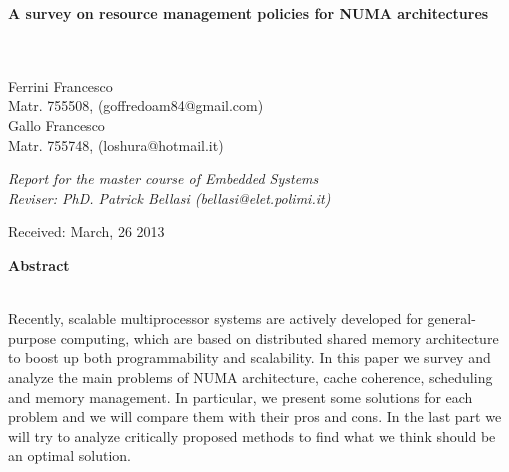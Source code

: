 \documentclass[a4paper,10pt]{article}
\newenvironment*{mytitle}{\begin{LARGE}\bf}{\end{LARGE}\\}%
\newenvironment*{myabstract}{\begin{Large}\bf}{\end{Large}\\[2.5ex]}%
\begin{document}
\begin{mytitle}A survey on resource management policies for NUMA architectures\end{mytitle}
%
%
\\
Ferrini Francesco\\
Matr. 755508, (goffredoam84@gmail.com)\\
\hspace{10ex}
Gallo Francesco\\
Matr. 755748, (loshura@hotmail.it)\\
\begin{flushright}
\emph{Report for the master course of Embedded Systems}\\
\emph{Reviser: PhD. Patrick Bellasi (bellasi@elet.polimi.it)}
\end{flushright}

Received: March, 26 2013\\
\hspace{10ex}

\begin{myabstract} Abstract \end{myabstract}
Recently, scalable multiprocessor systems are actively developed for general-purpose computing, which are based on distributed shared memory architecture to boost up both programmability and scalability. In this paper we survey and analyze the main problems of NUMA architecture, cache coherence, scheduling and memory management. In particular, we present some solutions for each problem and we will compare them with their pros and cons. In the last part we will try to analyze critically proposed methods to find what we think should be an optimal solution.
\end{document}
